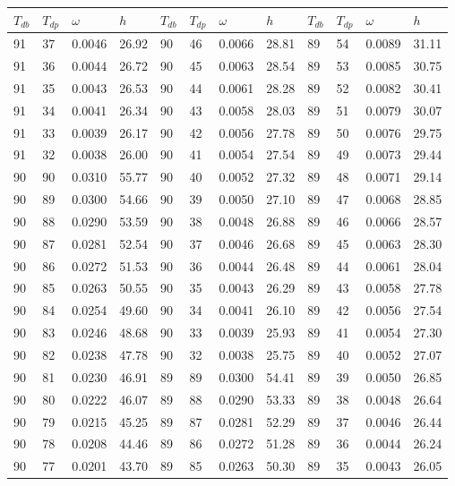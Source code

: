 \begin{tabular}{llll|llll|llll}
 \toprule 
\(T_{db}\) & \(T_{dp}\) & \(\omega\) & \(h\) & \(T_{db}\) & \(T_{dp}\) & \(\omega\) & \(h\) & \(T_{db}\) & \(T_{dp}\) & \(\omega\) & \(h\)  \\ \midrule 
91 & 37 & 0.0046 & 26.92 & 90 & 46 & 0.0066 & 28.81 & 89 & 54 & 0.0089 & 31.11\\
91 & 36 & 0.0044 & 26.72 & 90 & 45 & 0.0063 & 28.54 & 89 & 53 & 0.0085 & 30.75\\
91 & 35 & 0.0043 & 26.53 & 90 & 44 & 0.0061 & 28.28 & 89 & 52 & 0.0082 & 30.41\\
91 & 34 & 0.0041 & 26.34 & 90 & 43 & 0.0058 & 28.03 & 89 & 51 & 0.0079 & 30.07\\
91 & 33 & 0.0039 & 26.17 & 90 & 42 & 0.0056 & 27.78 & 89 & 50 & 0.0076 & 29.75\\
91 & 32 & 0.0038 & 26.00 & 90 & 41 & 0.0054 & 27.54 & 89 & 49 & 0.0073 & 29.44\\
90 & 90 & 0.0310 & 55.77 & 90 & 40 & 0.0052 & 27.32 & 89 & 48 & 0.0071 & 29.14\\
90 & 89 & 0.0300 & 54.66 & 90 & 39 & 0.0050 & 27.10 & 89 & 47 & 0.0068 & 28.85\\
90 & 88 & 0.0290 & 53.59 & 90 & 38 & 0.0048 & 26.88 & 89 & 46 & 0.0066 & 28.57\\
90 & 87 & 0.0281 & 52.54 & 90 & 37 & 0.0046 & 26.68 & 89 & 45 & 0.0063 & 28.30\\
90 & 86 & 0.0272 & 51.53 & 90 & 36 & 0.0044 & 26.48 & 89 & 44 & 0.0061 & 28.04\\
90 & 85 & 0.0263 & 50.55 & 90 & 35 & 0.0043 & 26.29 & 89 & 43 & 0.0058 & 27.78\\
90 & 84 & 0.0254 & 49.60 & 90 & 34 & 0.0041 & 26.10 & 89 & 42 & 0.0056 & 27.54\\
90 & 83 & 0.0246 & 48.68 & 90 & 33 & 0.0039 & 25.93 & 89 & 41 & 0.0054 & 27.30\\
90 & 82 & 0.0238 & 47.78 & 90 & 32 & 0.0038 & 25.75 & 89 & 40 & 0.0052 & 27.07\\
90 & 81 & 0.0230 & 46.91 & 89 & 89 & 0.0300 & 54.41 & 89 & 39 & 0.0050 & 26.85\\
90 & 80 & 0.0222 & 46.07 & 89 & 88 & 0.0290 & 53.33 & 89 & 38 & 0.0048 & 26.64\\
90 & 79 & 0.0215 & 45.25 & 89 & 87 & 0.0281 & 52.29 & 89 & 37 & 0.0046 & 26.44\\
90 & 78 & 0.0208 & 44.46 & 89 & 86 & 0.0272 & 51.28 & 89 & 36 & 0.0044 & 26.24\\
90 & 77 & 0.0201 & 43.70 & 89 & 85 & 0.0263 & 50.30 & 89 & 35 & 0.0043 & 26.05\\

\end{tabular}
